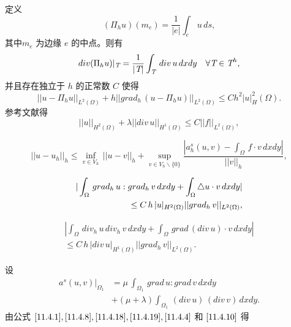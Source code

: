 \documentclass[a4paper,UTF8,titlepage,10pt]{ctexart}
\numberwithin{equation}{subsection}
\begin{document}
定义
\begin{equation}
	(\Pi_h u)(m_e) = \frac{1}{|e|} \int_e \, u \, ds,
	\label{11.4.12}
\end{equation}
其中$m_e$ 为边缘 $e$ 的中点。则有
\begin{equation}
	div(\Pi_h u)|_{\emph{T}} = \frac{1}{|\emph{T}|} \int_{\emph{T}} \, div \, u \, dxdy \quad \forall \emph{T} \in \emph{T}^h,
	\label{11.4.13}
\end{equation}
并且存在独立于 $h$ 的正常数 $C$ 使得
\begin{equation}
	|| u - \Pi_h u ||_{L^2(\Omega)} + h ||grad_h \, (u-\Pi_h u) ||_{L^2(\Omega)} \le C h^2 |u|_H^2(\Omega).
	\label{11.4.14}
\end{equation}
参考文献得
\begin{equation}
	||u||_{H^2(\Omega)} + \lambda ||div \, u||_{H^1(\Omega)} 
	\le C ||f||_{L^2(\Omega)} ,
	\label{11.4.4}
\end{equation}

\begin{equation}
	|| u - u_h ||_h \le \inf_{v \in V_h} \, ||u-v||_h + \sup_{v \in V_h \backslash \{0\}} \frac{|a_h^s(u,v) - \int_{\Omega} \, f \cdot v 
	\, dxdy|}{||v||_h} ,
	\label{11.4.17}
\end{equation}

\begin{equation}
\begin{aligned}
	\arrowvert \int_{\Omega} \, grad_h \, u : grad_h \, v \, dxdy + \int_{\Omega} \bigtriangleup u \cdot v \, dxdy \arrowvert \\
	\le C \, h \, |u|_{H^2(\Omega)} ||grad_h \, v||_{L^2(\Omega)},
\end{aligned}
\label{11.4.18}
\end{equation}

\begin{equation}
\begin{aligned}
	|\int_{\Omega} \, div_h \, u \, div_h \, v \, dxdy + \int_{\Omega} \, grad \, (div \, u) \cdot v \, dxdy| \\
	\le C \, h \, |div \, u|_{H^1(\Omega)} ||grad_h \, v||_{L^2(\Omega)}.
\end{aligned}
\label{11.4.19}
\end{equation}

设
\begin{equation}
\begin{aligned}
	a^s(u, v) |_{\Omega_1} &= \mu \, \int_{\Omega_1} \, grad \, u : grad \, v \, dxdy \\
	&+ (\mu +\lambda) \int_{\Omega_1} \, (div \, u) \, (div \, v) \, dxdy .
\end{aligned}
\end{equation}
由公式 $\eqref{11.4.1}, \eqref{11.4.8}, \eqref{11.4.18}, \eqref{11.4.19}, \eqref{11.4.4}$ 和 $\eqref{11.4.10}$ 得
\end{document}
